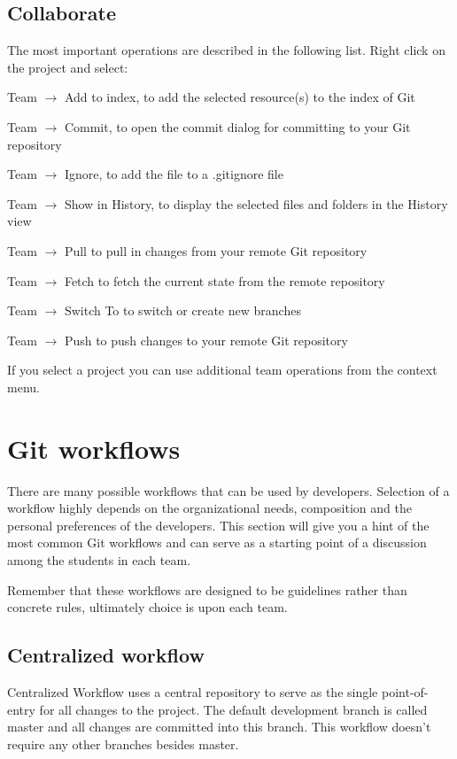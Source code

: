 \documentclass{article}
\begin{document}
\subsection{Collaborate}

The most important operations are described in the following
list. Right click on the project and select:

Team $\rightarrow$ Add to index, to add the selected resource(s) to the index of Git

Team $\rightarrow$ Commit, to open the commit dialog for committing to your Git repository

Team $\rightarrow$ Ignore, to add the file to a .gitignore file

Team $\rightarrow$ Show in History, to display the selected files and folders in the History view

Team $\rightarrow$ Pull to pull in changes from your remote Git repository

Team $\rightarrow$ Fetch to fetch the current state from the remote repository

Team $\rightarrow$ Switch To to switch or create new branches

Team $\rightarrow$ Push to push changes to your remote Git repository

If you select a project you can use additional team operations from
the context menu.



\newpage

\section{Git workflows}

There are many possible workflows that can be used by
developers. Selection of a workflow highly depends on the
organizational needs, composition and the personal preferences of the
developers. This section will give you a hint of the most common Git
workflows and can serve as a starting point of a discussion among
the students in each team.  

Remember that these workflows are designed to be guidelines rather
than concrete rules, ultimately choice is upon each team.

\subsection{Centralized workflow}

Centralized Workflow uses a central repository to serve as the single
point-of-entry for all changes to the project. The
default development branch is called master and all changes are
committed into this branch. This workflow doesn't require any other
branches besides master. 
\end{document}
